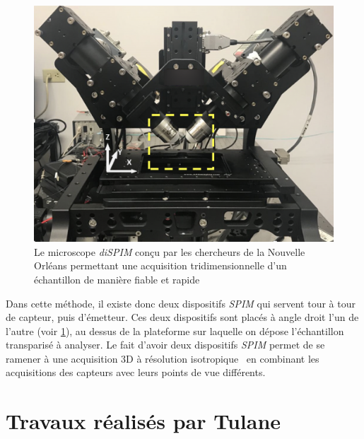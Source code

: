 {{		\begin{figure}[H]
			\centering
			\includegraphics[width=0.5\linewidth]{./img/lsm_device_02.png}
			\caption{Le microscope \textit{diSPIM} conçu par les chercheurs de la Nouvelle Orléans permettant une acquisition tridimensionnelle d'un échantillon de manière fiable et rapide}
			\label{lsm_02_device}
		\end{figure}

		Dans cette méthode, il existe donc deux dispositifs \textit{SPIM} qui servent tour à tour de capteur, puis d'émetteur. Ces deux dispositifs sont placés à angle droit l'un de l'autre (voir \ref{lsm_02_device}), au dessus de la plateforme sur laquelle on dépose l'échantillon transparisé à analyser. Le fait d'avoir deux dispositifs \textit{SPIM} permet de se ramener à une acquisition 3D à résolution isotropique\footnotemark~ en combinant les acquisitions des capteurs avec leurs points de vue différents.\par
	}

	\section{Travaux réalisés par Tulane}
	{
		\\
	}

	\\
}

